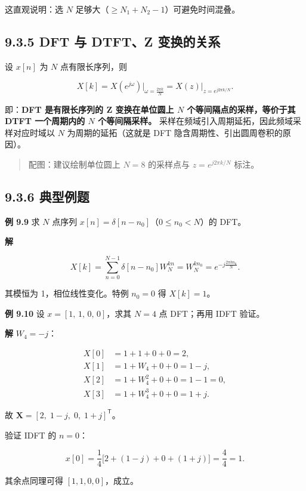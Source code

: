 这直观说明：选 \(N\) 足够大（\(\ge N_1+N_2-1\)）可避免时间混叠。

\subsection{9.3.5 DFT 与 DTFT、Z
变换的关系}\label{dft-ux4e0e-dtftz-ux53d8ux6362ux7684ux5173ux7cfb}

设 \(x[n]\) 为 \(N\) 点有限长序列，则

\[
X[k] = X(e^{j\omega})\Big|_{\omega=\frac{2\pi k}{N}}
= X(z)\Big|_{z=e^{j2\pi k/N}} .
\]

即：\textbf{DFT 是有限长序列的 Z 变换在单位圆上 \(N\)
个等间隔点的采样，等价于其 DTFT 一个周期内的 \(N\) 个等间隔采样。}
采样在频域引入周期延拓，因此频域采样对应时域以 \(N\)
为周期的延拓（这就是 DFT 隐含周期性、引出圆周卷积的原因）。

\begin{quote}
配图：建议绘制单位圆上 \(N=8\) 的采样点与 \(z=e^{j2\pi k/N}\) 标注。
\end{quote}

\subsection{9.3.6 典型例题}\label{ux5178ux578bux4f8bux9898-8}

\textbf{例 9.9} 求 \(N\) 点序列
\(x[n]=\delta[n-n_0]\)（\(0\le n_0<N\)）的 DFT。

\textbf{解}

\[
X[k]=\sum_{n=0}^{N-1}\delta[n-n_0]W_N^{kn}=W_N^{k n_0}=e^{-j\frac{2\pi k n_0}{N}} .
\]

其模恒为 1，相位线性变化。特例 \(n_0=0\) 得 \(X[k]=1\)。

\textbf{例 9.10} 设 \(x=[1,\,1,\,0,\,0]\)，求其 \(N=4\) 点 DFT；再用
IDFT 验证。

\textbf{解} \(W_4=-j\)：

\[
\begin{aligned}
X[0]&=1+1+0+0=2,\\
X[1]&=1+W_4+0+0=1-j,\\
X[2]&=1+W_4^2+0+0=1-1=0,\\
X[3]&=1+W_4^3+0+0=1+j.
\end{aligned}
\]

故 \(\mathbf{X}=[2,\;1-j,\;0,\;1+j]^{\mathsf{T}}\)。

验证 IDFT 的 \(n=0\)：

\[
x[0]=\frac14\bigl[2+(1-j)+0+(1+j)\bigr]=\frac{4}{4}=1 .
\]

其余点同理可得 \([1,1,0,0]\)，成立。

